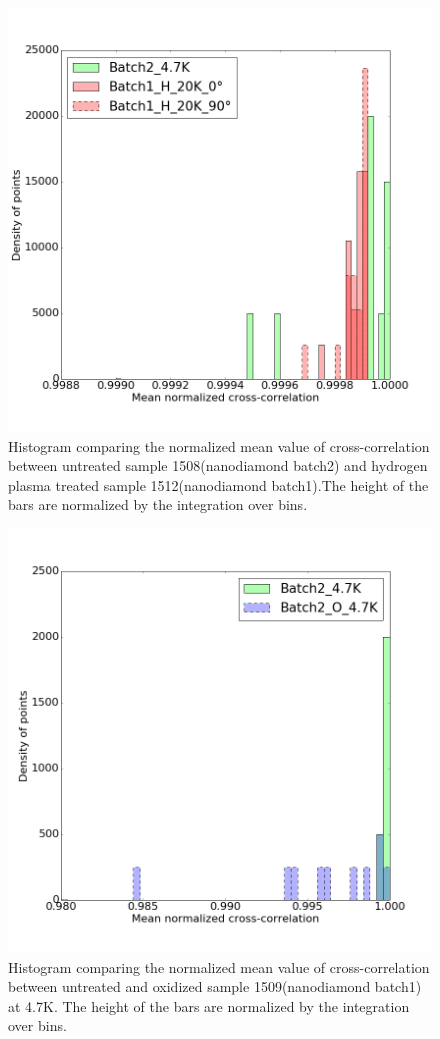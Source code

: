 \begin{figure}[h]
\centering
\includegraphics[width=0.7\linewidth]{"Figures/pic/Histogram of normalized cross-correlation_1_H_2"}
\caption{Histogram comparing the normalized mean value of cross-correlation between untreated sample 1508(nanodiamond batch2) and hydrogen plasma treated sample 1512(nanodiamond batch1).The height of the bars are normalized by the integration over bins.  }
\label{fig:histogram-of-normalized-cross-correlation1h2}
\end{figure}

\begin{figure}[h]
\centering
\includegraphics[width=0.7\linewidth]{"Figures/pic/Histogram of normalized cross-correlation_2_o"}
\caption{Histogram comparing the normalized mean value of cross-correlation between untreated and oxidized sample 1509(nanodiamond batch1) at 4.7K. The height of the bars are normalized by the integration over bins. }
\label{fig:histogram-of-normalized-cross-correlation2o}
\end{figure}


